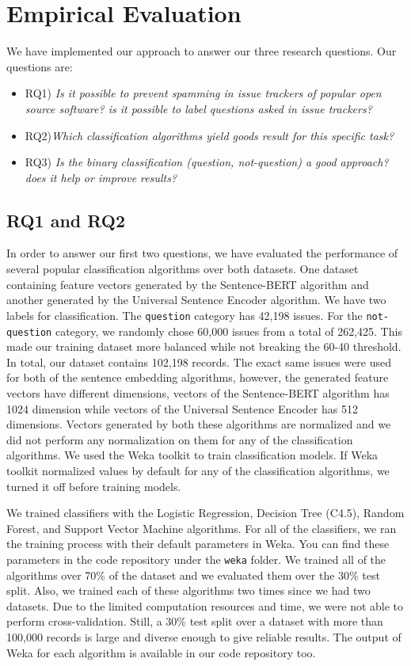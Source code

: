 \documentclass[conference]{IEEEtran}
\begin{document}
\section{Empirical Evaluation}\label{eval}
We have implemented our approach to answer our three research questions. Our questions are:
\begin{itemize}
  \item{RQ1)} \textit{Is it possible to prevent spamming in issue trackers of popular open source software? 
  is it possible to label questions asked in issue trackers?}
  \item{RQ2)}\textit{Which classification algorithms yield goods result for this specific task?}
  \item{RQ3)} \textit{Is the binary classification (question, not-question) a good approach? 
  does it help or improve results?}
\end{itemize}

\subsection{RQ1 and RQ2}
In order to answer our first two questions, we have evaluated the performance of several popular
classification algorithms over both datasets. One dataset containing feature vectors generated by 
the Sentence-BERT algorithm and another generated by the Universal Sentence Encoder algorithm. We have two labels for
classification. The \verb|question| category has 42,198 issues. For the \verb|not-question| category, 
we randomly chose 60,000 issues from a total of 262,425. This made our training dataset more balanced
while not breaking the 60-40 threshold. In total, our dataset contains 102,198 records. The exact same issues were used 
for both of the sentence embedding algorithms, however, the generated feature vectors have different dimensions, 
vectors of the Sentence-BERT algorithm has 1024 dimension while vectors of the Universal Sentence Encoder has 
512 dimensions. Vectors generated by both these algorithms are normalized and we did not perform any normalization
on them for any of the classification algorithms. We used the Weka toolkit to train classification models. 
If Weka toolkit normalized values by default for any of the classification algorithms, 
we turned it off before training models. 

We trained classifiers with the Logistic Regression, Decision Tree (C4.5), Random Forest, and Support Vector Machine
algorithms. For all of the classifiers, we ran the training process with their default parameters in Weka. You can find 
these parameters in the code repository under the \verb|weka| folder. We trained all of the algorithms over 70\%
of the dataset and we evaluated them over the 30\% test split. Also, we trained each of these algorithms two 
times since we had two datasets. Due to the limited computation resources and time, we were not able to 
perform cross-validation. Still, a 30\% test split over a dataset with more than 100,000 records is large 
and diverse enough to give reliable results.
The output of Weka for each algorithm is available in our code repository too. 
\end{document}
